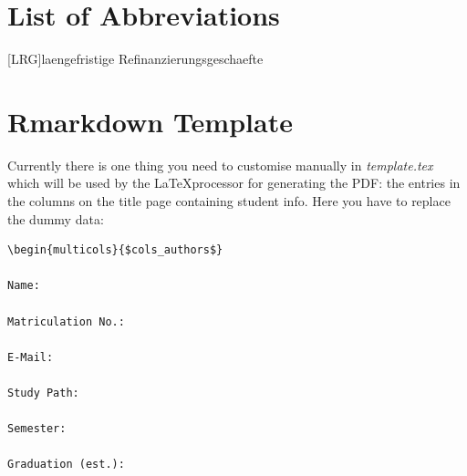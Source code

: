 \documentclass[11pt,a4paper]{article}
\begin{document}


{
\hypersetup{linkcolor=black}

\setcounter{tocdepth}{3}
\tableofcontents
}

\newpage
\listoffigures
{}

\listoftables
{}

\section*{List of Abbreviations}

\begin{adjustwidth}{1.5em}{0pt}

\begin{acronym}[dummyyyy]
 [LRG]{laengefristige Refinanzierungsgeschaefte}

\end{acronym}

\end{adjustwidth}

\restoregeometry

\newpage
{}
\hypertarget{rmarkdown-template}{%
\section{Rmarkdown Template}\label{rmarkdown-template}}

Currently there is one thing you need to customise manually in
\emph{template.tex} which will be used by the \LaTeX processor for
generating the PDF: the entries in the columns on the title page
containing student info. Here you have to replace the dummy data:

\begin{verbatim}
\begin{multicols}{$cols_authors$}

Name:

Matriculation No.:

E-Mail:

Study Path:

Semester:

Graduation (est.):
\end{verbatim}
\end{document}
